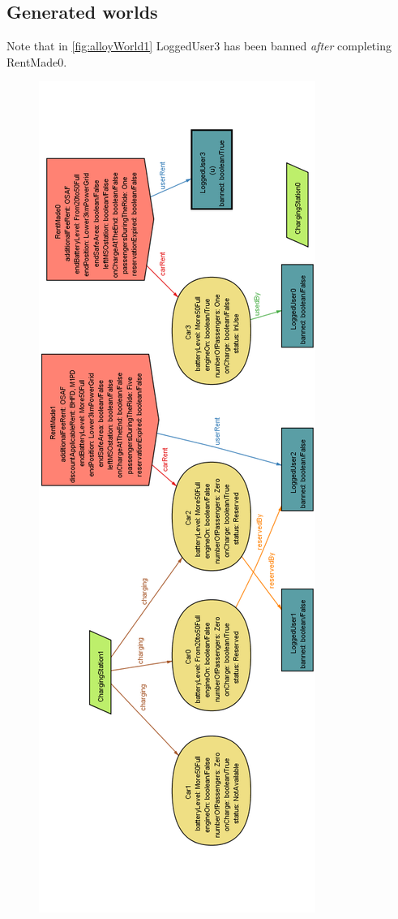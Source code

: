 \begin{appendices}
		\subsection{Generated worlds}
			Note that in \autoref{fig:alloyWorld1} LoggedUser3 has been banned \emph{after} completing RentMade0.
			\begin{figure}[h!]
			\centering
			\includegraphics[scale=0.39]{alloy/AlloyWorld2.png}

\end{figure}
\end{appendices}
